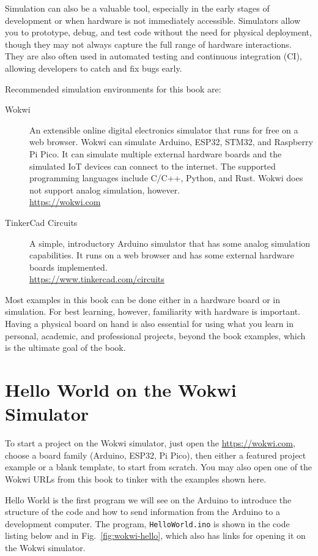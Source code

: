 Simulation can also be a valuable tool, especially in the early stages of development or when hardware is not immediately accessible.
Simulators allow you to prototype, debug, and test code without the need for physical deployment, though they may not always capture the full range of hardware interactions.
They are also often used in automated testing and continuous integration (CI), allowing developers to catch and fix bugs early.

Recommended simulation environments for this book are:
\begin{description}
\item[Wokwi] 
  An extensible online digital electronics simulator that runs for free on a web browser.
  Wokwi can simulate Arduino, ESP32, STM32, and Raspberry Pi Pico.
  It can simulate multiple external hardware boards and the simulated IoT devices can connect to the internet.
  The supported programming languages include C/C++, Python, and Rust.
  Wokwi does not support analog simulation, however.\\
  \url{https://wokwi.com}
\item[TinkerCad Circuits] 
  A simple, introductory Arduino simulator that has some analog simulation capabilities.
  It runs on a web browser and has some external hardware boards implemented.\\
  \url{https://www.tinkercad.com/circuits}
\end{description}

Most examples in this book can be done either in a hardware board or in simulation.
For best learning, however, familiarity with hardware is important.
Having a physical board on hand is also essential for using what you learn in personal, academic, and professional projects, beyond the book examples, which is the ultimate goal of the book.

\section{Hello World on the Wokwi Simulator}

To start a project on the Wokwi simulator, just open the \url{https://wokwi.com}, choose a board family (Arduino, ESP32, Pi Pico), then either a featured project example or a blank template, to start from scratch.
You may also open one of the Wokwi URLs from this book to tinker with the examples shown here.

Hello World is the first program we will see on the Arduino to introduce the structure of the code and how to send information from the Arduino to a development computer.
The program, \texttt{HelloWorld.ino} is shown in the code listing below and in Fig.~\ref{fig:wokwi-hello}, which also has links for opening it on the Wokwi simulator.

